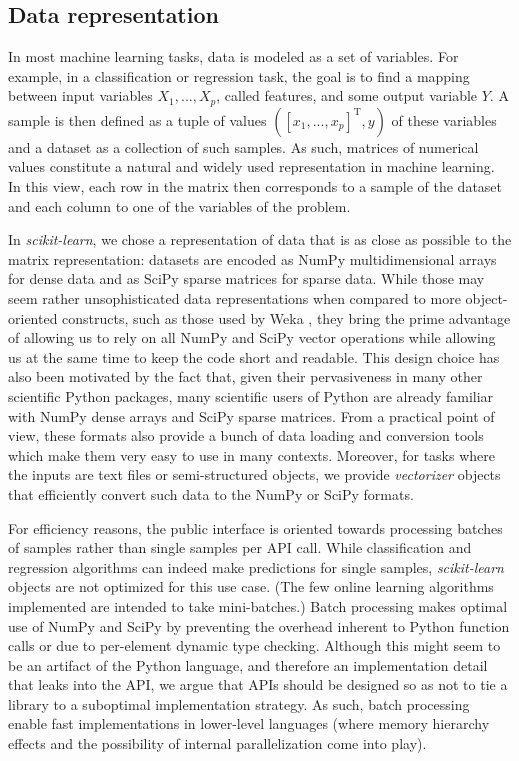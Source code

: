 \documentclass{llncs}
\newcommand{\sklearn}{\textit{scikit-learn}\xspace}
\begin{document}
\subsection{Data representation}
\label{sec:arrays}

In most machine learning tasks, data is modeled as a set of variables.  For
example, in a classification or regression task, the goal is to find a mapping
between input variables $X_1, ..., X_p$, called features, and
some output variable $Y$. A sample is then defined as a tuple of values $([x_1,
..., x_p]^\mathrm{T}, y)$ of these variables and a dataset as a collection of
such samples.  As such, matrices of numerical values constitute a natural and
widely used representation in machine learning. In this view, each row in the
matrix then corresponds to a sample of the dataset and each column to one of the
variables of the problem.

In \sklearn, we chose a representation of data that is as close as
possible to the matrix representation: datasets are encoded as NumPy
multidimensional arrays for dense data and as SciPy sparse matrices for sparse
data. While those may seem rather unsophisticated data representations when
compared to more object-oriented constructs, such as those used by
Weka \citep{hall2009weka}, they bring the prime advantage of allowing us to rely
on all NumPy and SciPy vector operations while allowing us at the same time to
keep the code short and readable.  This design choice has also been motivated by
the fact that, given their pervasiveness in many other scientific Python
packages, many scientific users of Python are already familiar with NumPy dense
arrays and SciPy sparse matrices.
From a practical point of view, these formats also provide a bunch of
data loading and conversion tools which make them very easy to use in many
contexts. Moreover, for tasks where the inputs are text files or semi-structured
objects, we provide \textit{vectorizer} objects that efficiently convert such
data to the NumPy or SciPy formats.

For efficiency reasons, the public interface is oriented towards processing
batches of samples rather than single samples per API call. While classification
and regression algorithms can indeed make predictions for single samples,
\sklearn objects are not optimized for this use case. (The few online learning
algorithms implemented are intended to take mini-batches.) Batch processing makes
optimal use of NumPy and SciPy by preventing the overhead inherent to Python
function calls or due to per-element dynamic type checking. Although this might
seem to be an artifact of the Python language, and therefore an implementation
detail that leaks into the API, we argue that APIs should be designed so as not
to tie a library to a suboptimal implementation strategy. As such, batch
processing enable fast implementations in lower-level languages (where memory
hierarchy effects and the possibility of internal parallelization come into
play).
\end{document}
